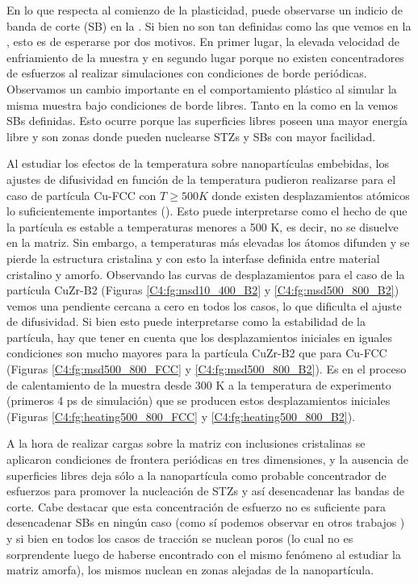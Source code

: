 En lo que respecta al comienzo de la plasticidad, puede observarse un indicio de banda de corte (SB) en la . Si bien no son tan definidas como las que vemos en la , esto es de esperarse por dos motivos. En primer lugar, la elevada velocidad de enfriamiento de la muestra y en segundo lugar porque no existen concentradores de esfuerzos al realizar simulaciones con condiciones de borde periódicas. Observamos un cambio importante en el comportamiento plástico al simular la misma muestra bajo condiciones de borde libres. Tanto en la  como en la  vemos SBs definidas. Esto ocurre porque las superficies libres poseen una mayor energía libre y son zonas donde pueden nuclearse STZs y SBs con mayor facilidad.

Al estudiar los efectos de la temperatura sobre nanopartículas embebidas, los ajustes de difusividad en función de la temperatura pudieron realizarse para el caso de partícula Cu-FCC con $T \geq 500 K$ donde existen desplazamientos atómicos lo suficientemente importantes (). Esto puede interpretarse como el hecho de que la partícula es estable a temperaturas menores a 500 K, es decir, no se disuelve en la matriz. Sin embargo, a temperaturas más elevadas los átomos difunden y se pierde la estructura cristalina y con esto la interfase definida entre material cristalino y amorfo. Observando las curvas de desplazamientos para el caso de la partícula CuZr-B2 (Figuras \ref{C4:fg:msd10_400_B2} y \ref{C4:fg:msd500_800_B2}) vemos una pendiente cercana a cero en todos los casos, lo que dificulta el ajuste de difusividad. Si bien esto puede interpretarse como la estabilidad de la partícula, hay que tener en cuenta que los desplazamientos iniciales en iguales condiciones son mucho mayores para la partícula CuZr-B2 que para Cu-FCC (Figuras \ref{C4:fg:msd500_800_FCC} y \ref{C4:fg:msd500_800_B2}). Es en el proceso de calentamiento de la muestra desde 300 K a la temperatura de experimento (primeros 4 ps de simulación) que se producen estos desplazamientos iniciales (Figuras \ref{C4:fg:heating500_800_FCC} y \ref{C4:fg:heating500_800_B2}).

A la hora de realizar cargas sobre la matriz con inclusiones cristalinas se aplicaron condiciones de frontera periódicas en tres dimensiones, y la ausencia de superficies libres deja sólo a la nanopartícula como probable concentrador de esfuerzos para promover la nucleación de STZs y así desencadenar las bandas de corte. Cabe destacar que esta concentración de esfuerzo no es suficiente para desencadenar SBs en ningún caso (como sí podemos observar en otros trabajos \citep{albe13,brink15,adibi13,adibi14}) y si bien en todos los casos de tracción se nuclean poros (lo cual no es sorprendente luego de haberse encontrado con el mismo fenómeno al estudiar la matriz amorfa), los mismos nuclean en zonas alejadas de la nanopartícula.

